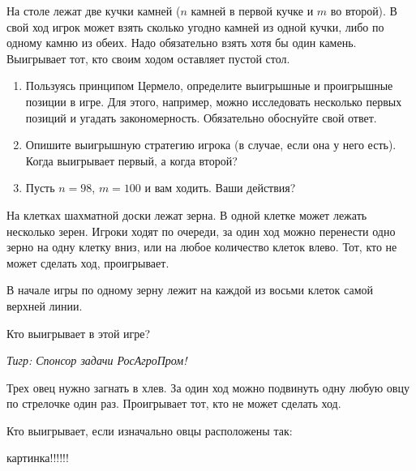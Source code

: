 \begin{problem}
\begin{source}
\cite{savva:nmu}
\end{source}
  На столе лежат две кучки камней ($n$ камней в первой кучке и $m$ во второй). В свой ход игрок может взять сколько угодно камней из одной кучки, либо по одному камню из обеих. Надо обязательно взять хотя бы один камень. Выигрывает тот, кто своим ходом оставляет пустой стол.
\begin{enumerate}
\item Пользуясь принципом Цермело, определите выигрышные и проигрышные позиции в игре. Для этого, например, можно исследовать несколько первых позиций и угадать закономерность. Обязательно обоснуйте свой ответ.
\item Опишите выигрышную стратегию игрока (в случае, если она у него есть). Когда выигрывает первый, а когда второй?
\item Пусть $n = 98$, $m=100$ и вам ходить. Ваши действия?
\end{enumerate}






\begin{sol}

\end{sol}
\end{problem}



\begin{problem}
На клетках шахматной доски лежат зерна. В одной клетке может лежать несколько зерен. Игроки ходят по очереди, за один ход можно перенести одно зерно на одну клетку вниз, или на любое количество клеток влево. Тот, кто не может сделать ход, проигрывает.\par
В начале игры по одному зерну лежит на каждой из восьми клеток самой верхней линии.\par
Кто выигрывает в этой игре?\par
{\it Тигр: Спонсор задачи РосАгроПром!}



\begin{sol}

\end{sol}
\end{problem}




\begin{problem}
Трех овец нужно загнать в хлев. За один ход можно подвинуть одну любую овцу по стрелочке один раз. Проигрывает тот, кто не может сделать ход. \par
Кто выигрывает, если изначально овцы расположены так:


{\red картинка!!!!!!}



\begin{sol}

\end{sol}
\end{problem}



